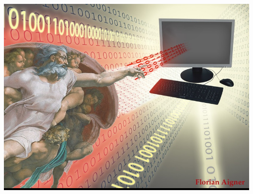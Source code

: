 \begin{frame}[plain]
\colorbox{black}{\includegraphics[width=\textwidth]{TUWien-GodComputerC}}
\end{frame}
